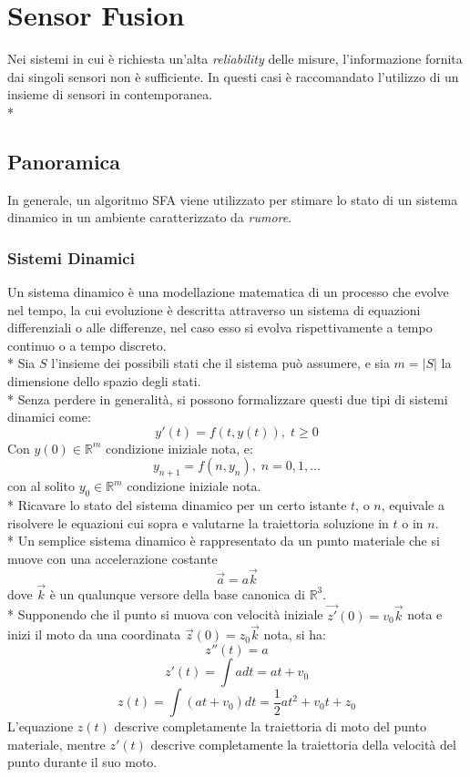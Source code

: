 \chapter{Sensor Fusion}
Nei sistemi in cui \`e richiesta un'alta \emph{reliability} delle misure, l'informazione fornita dai singoli sensori non \`e sufficiente. In questi casi \`e raccomandato l'utilizzo di un insieme di sensori in contemporanea.\\*
\section{Panoramica}
In generale, un algoritmo SFA viene utilizzato per stimare lo stato di un sistema dinamico in un ambiente caratterizzato da \emph{rumore}.
\subsection{Sistemi Dinamici}
Un sistema dinamico \`e una modellazione matematica di un processo che evolve nel tempo, la cui evoluzione \`e descritta attraverso un sistema di equazioni differenziali o alle differenze, nel caso esso si evolva rispettivamente a tempo continuo o a tempo discreto.\\*
Sia $S$ l'insieme dei possibili stati che il sistema pu\`o assumere, e sia $m = |S|$ la dimensione dello spazio degli stati.\\*
Senza perdere in generalit\`a, si possono formalizzare questi due tipi di sistemi dinamici come:
$$
y'(t) = f(t,y(t)),\;t\ge 0
$$
Con $y(0) \in \mathbb{R}^m$ condizione iniziale nota, e:
$$
y_{n+1} = f(n,y_n),\;n = 0,1,\dots
$$
con al solito $y_0 \in \mathbb{R}^m$ condizione iniziale nota.\\*
Ricavare lo stato del sistema dinamico per un certo istante $t$, o $n$, equivale a risolvere le equazioni cui sopra e valutarne la traiettoria soluzione in $t$ o in $n$.\\*
Un semplice sistema dinamico \`e rappresentato da un punto materiale che si muove con una accelerazione costante $$\vec{a} = a\vec{k}$$ dove $\vec{k}$ \`e un qualunque versore della base canonica di $\mathbb{R}^3$.\\*
Supponendo che il punto si muova con velocit\`a iniziale $\vec{z'}(0) = v_0\vec{k}$ nota e inizi il moto da una coordinata $\vec z(0) = z_0\vec{k}$ nota, si ha:
$$
z''(t) = a
$$
$$
z'(t) = \int{a dt} = a t + v_0
$$
$$
z(t) = \int(a t + v_0)dt = \frac{1}{2} at^2 +  v_0 t + z_0
$$
L'equazione $z(t)$ descrive completamente la traiettoria di moto del punto materiale, mentre $z'(t)$ descrive completamente la traiettoria della velocit\`a del punto durante il suo moto.
